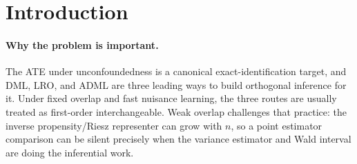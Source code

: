 \documentclass[11pt]{article}
\theoremstyle{definition}
\theoremstyle{plain}
\theoremstyle{remark}
\begin{document}
\begin{abstract}
This proposal asks whether three orthogonal ATE point estimators can be
first-order equivalent while their Wald studentizations are not.  The proposed
kernel is a local-to-weak-overlap frontier: after normalizing all three
estimators to the same ATE efficient influence function, the point estimates
remain mutually equivalent over a region of \((r_g,r_\alpha,\omega)\), but the
studentized statistics separate whenever a named covariance-kernel eigenvalue
dominates the nuisance-rate product.  The novel object is the studentization
gap kernel \(S_n\), built from the observable variance-score summands used by
the DML empirical score variance, the LRO sandwich variance, and the ADML
misspecification-robust Riesz variance.  Conjecture
\ref{conj:student-frontier} gives the
sharp iff boundary for \(\widehat T_D-\widehat T_A\) and
\(\widehat T_L-\widehat T_A\), while Theorem \ref{thm:common-eif} records the
standard common-EIF collapse under fixed overlap and product rates.  Resolving
the conjecture would tell applied users when DML, LRO, and ADML confidence
intervals can be reported interchangeably and when ADML's robust
studentization is the first object that detects weak-overlap fragility.
\end{abstract}

\section{Introduction}
\paragraph{Why the problem is important.}
The ATE under unconfoundedness is a canonical exact-identification target, and
DML, LRO, and ADML are three leading ways to build orthogonal inference for it.
Under fixed overlap and fast nuisance learning, the three routes are usually
treated as first-order interchangeable.  Weak overlap challenges that practice:
the inverse propensity/Riesz representer can grow with \(n\), so a point
estimator comparison can be silent precisely when the variance estimator and
Wald interval are doing the inferential work.
\end{document}
